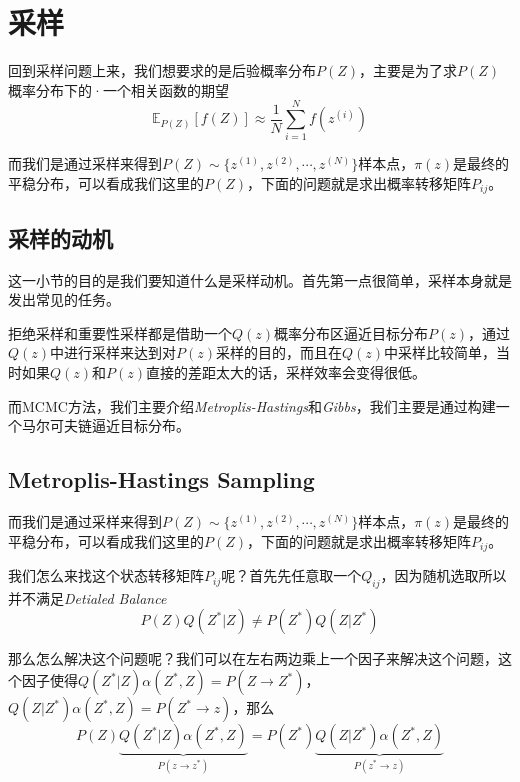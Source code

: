 \chapter{采样}

回到采样问题上来，我们想要求的是后验概率分布$P(Z)$，主要是为了求$P(Z)$概率分布下的·一个相关函数的期望
\begin{equation}
    \mathbb{E}_{P(Z)}[f(Z)]\approx \frac{1}{N}\sum_{i=1}^{N}f(z^{(i)})
\end{equation}

而我们是通过采样来得到$P(Z)\sim\{z^{(1)},z^{(2)},\cdots,z^{(N)}\}$样本点，$\pi(z)$是最终的平稳分布，可以看成我们这里的$P(Z)$，下面的问题就是求出概率转移矩阵$P_{ij}$。

\section{采样的动机}

这一小节的目的是我们要知道什么是采样动机。首先第一点很简单，采样本身就是发出常见的任务。

拒绝采样和重要性采样都是借助一个$Q(z)$概率分布区逼近目标分布$P(z)$，通过$Q(z)$中进行采样来达到对$P(z)$采样的目的，而且在$Q(z)$中采样比较简单，当时如果$Q(z)$和$P(z)$直接的差距太大的话，采样效率会变得很低。

而MCMC方法，我们主要介绍\textsl{Metroplis-Hastings}和\textsl{Gibbs}，我们主要是通过构建一个马尔可夫链逼近目标分布。

\section{Metroplis-Hastings Sampling}

而我们是通过采样来得到$P(Z)\sim\{z^{(1)},z^{(2)},\cdots,z^{(N)}\}$样本点，$\pi(z)$是最终的平稳分布，可以看成我们这里的$P(Z)$，下面的问题就是求出概率转移矩阵$P_{ij}$。

我们怎么来找这个状态转移矩阵$P_{ij}$呢？首先先任意取一个$Q_{ij}$，因为随机选取所以并不满足\textsl{Detialed Balance}
\begin{equation}
    P(Z)Q(Z^*|Z)\neq P(Z^*)Q(Z|Z^*)
\end{equation}

那么怎么解决这个问题呢？我们可以在左右两边乘上一个因子来解决这个问题，这个因子使得$Q(Z^*|Z)\alpha(Z^*,Z)=P(Z\rightarrow Z^*)$，
$Q(Z|Z^*)\alpha(Z^*,Z)=P(Z^*\rightarrow z)$，那么
\begin{equation}
    P(Z)\underbrace{Q(Z^*|Z)\alpha(Z^*,Z)}_{P(z\rightarrow z^*)}=P(Z^*)\underbrace{Q(Z|Z^*)\alpha(Z^*,Z)}_{P(z^*\rightarrow z)}
\end{equation}

